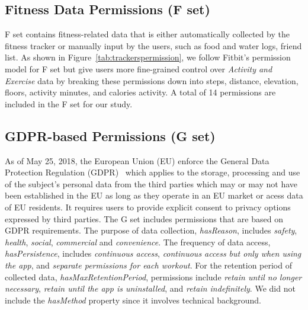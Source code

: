 \subsection{Fitness Data Permissions (F set)}
\label{sec:fset}
F set contains fitness-related data that is either automatically collected by the fitness tracker or manually input by the users, such as food and water logs, friend list. As shown in Figure~\ref{tab:trackerspermission}, we follow Fitbit's permission model for F set but give users more fine-grained control over \textit{Activity and Exercise} data by breaking these permissions down into steps, distance, elevation, floors, activity minutes, and calories activity. A total of 14 permissions are included in the F set for our study. 


\subsection{GDPR-based Permissions (G set)}
\label{sec:gset}
As of May 25, 2018, the European Union (EU) enforce the General Data Protection Regulation (GDPR)~\cite{ref:GDPR} which applies to the storage, processing and use of the subject's personal data from the third parties which may or may not have been established in the EU as long as they operate in an EU market or acess data of EU residents. It requires users to provide explicit consent to privacy options expressed by third parties.
The G set includes permissions that are based on GDPR requirements. The purpose of data collection, \textit{hasReason}, includes \textit{safety}, \textit{health}, \textit{social}, \textit{commercial} and \textit{convenience}. The frequency of data access, \textit{hasPersistence}, includes \textit{continuous access}, \textit{continuous access but only when using the app}, and \textit{separate permissions for each workout}. For the retention period of collected data, \textit{hasMaxRetentionPeriod}, permissions include \textit{retain until no longer necessary}, \textit{retain until the app is uninstalled}, and \textit{retain indefinitely}. We did not include the \textit{hasMethod} property since it involves technical background.

